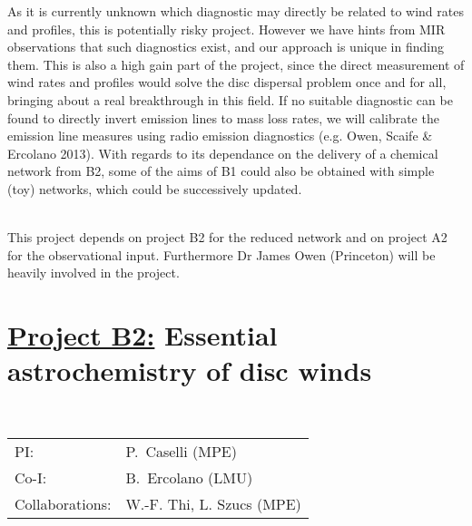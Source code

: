 As it is currently unknown which diagnostic may directly be related to
wind rates and profiles, this is potentially risky
project. However we have hints from MIR observations that such
diagnostics exist, and our approach is unique in finding them. This is
also a high gain part of the project, since the direct measurement of
wind rates and profiles would solve the disc dispersal problem once
and for all, bringing about a real breakthrough in this field.  If no
suitable diagnostic can be found to directly invert emission lines to
mass loss rates, we will calibrate the emission line measures using
radio emission diagnostics (e.g. Owen, Scaife \& Ercolano 2013). With
regards to its dependance on the delivery of a chemical network from
B2, some of the aims of B1 could also be obtained with simple (toy)
networks, which could be successively updated. 

\vspace{0.5em}
\\
This project depends on project B2 for the reduced network and on
project A2 for the observational input. Furthermore Dr
James Owen (Princeton) will be heavily involved in the project.  


\def\remove#1{}




\pagebreak[4]

\section*{\underline{Project B2:} 
Essential astrochemistry of disc winds}

\\
\begin{tabular}{ll}
{\textsf{PI:}}                  & P.~Caselli (MPE)\\
{\textsf{Co-I:}}                &B.~Ercolano (LMU)\\
{\textsf{Collaborations:}}      &W.-F. Thi, L. Szucs (MPE) \\
\end{tabular}

